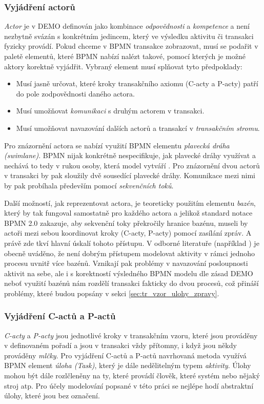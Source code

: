 \documentclass[]{article}
\begin{document}
\subsubsection{Vyjádření actorů}
\textit{Actor} je v DEMO definován jako kombinace \textit{odpovědnosti} a \textit{kompetence} a není nezbytně svázán s konkrétním jedincem, který ve výsledku aktivitu či transakci fyzicky provádí. Pokud chceme v BPMN transakce zobrazovat, musí se podařit v paletě elementů, které BPMN nabízí nalézt takové, pomocí kterých je možné aktory korektně vyjádřit. Vybraný element musí splňovat tyto předpoklady:

\begin{itemize}
\item Musí jasně určovat, které kroky transakčního axiomu (C-acty a P-acty) patří do pole zodpovědnosti daného actora.
\item Musí umožňovat \textit{komunikaci} s druhým actorem v transakci.
\item Musí umožňovat navazování dalších actorů a transakcí v \textit{transakčním stromu}.
\end{itemize}

Pro znázornění actora se nabízí využití BPMN elementu \textit{plavecká dráha (swimlane)}. BPMN nijak konkrétně nespecifikuje, jak plavecké dráhy využívat a nechává to tedy v rukou osoby, která model vytváří \cite{Silver2011}. Pro znázornění dvou actorů v transakci by pak sloužily dvě sousedící plavecké dráhy. Komunikace mezi nimi by pak probíhala především pomocí \textit{sekvenčních toků}.

Další možností, jak reprezentovat actora, je teoreticky použitím elementu \textit{bazén}, který by tak fungoval samostatně pro každého actora a jelikož standard notace BPMN 2.0 zakazuje, aby sekvenční toky překročily hranice bazénu, museli by actoři mezi sebou koordinovat kroky (C-acty, P-acty) pomocí zasílání zpráv. A právě zde tkví hlavní úskalí tohoto přístupu. V odborné literatuře (například \cite{Silver2011}) je obecně uváděno, že není dobrým přístupem modelovat aktivity v rámci jednoho procesu uvnitř více bazénů. Vznikají pak problémy v navazování posloupnosti aktivit na sebe, ale i s korektností výsledného BPMN modelu dle zásad DEMO neboť využití bazénů nám rozdělí transakci fakticky do dvou procesů, což přináší problémy, které budou popsány v sekci \ref{sec:tr_vzor_ulohy_zpravy}.

\subsubsection{Vyjádření C-actů a P-actů}
\textit{C-acty} a \textit{P-acty} jsou jednotlivé kroky v transakčním vzoru, které jsou prováděny v definovaném pořadí a jsou v transakci vždy přítomny, i když jsou někdy prováděny \textit{mlčky}. Pro vyjádření C-actů a P-actů navrhovaná metoda využívá BPMN element \textit{úloha (Task)}, který je dále nedělitelným typem \textit{aktivity}. Úlohy mohou být dále rozlčleněny na ty, které provádí člověk, které systém nebo nějaký stroj atp. Pro účely modelování popsané v této práci se nejlépe hodí abstraktní úlohy, které jsou bez označení. 
\end{document}
